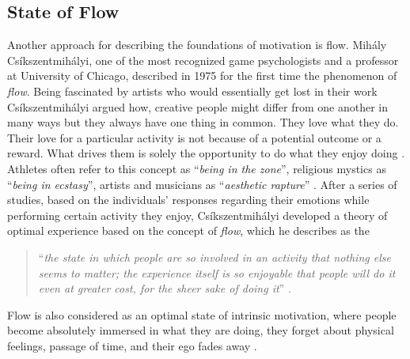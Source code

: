 \subsection{State of Flow}
Another approach for describing the foundations of motivation is \acrlong{flow}. Mih\'{a}ly Cs\'{i}kszentmih\'{a}lyi, one of the most recognized game psychologists and a professor at University of Chicago, described in 1975 for the first time the phenomenon of \textit{flow}. Being fascinated by artists who would essentially get lost in their work Cs\'{i}kszentmih\'{a}lyi argued how, creative people might differ from one another in many ways but they always have one thing in common. They love what they do. Their love for a particular activity is not because of a potential outcome or a reward. What drives them is solely the opportunity to do what they enjoy doing \cite{csikszentmihalyi1996flow}. Athletes often refer to this concept as ``\textit{being in the zone}'', religious mystics
as ``\textit{being in ecstasy}'', artists and musicians as ``\textit{aesthetic rapture}'' \cite{csikszentmihalyi1997finding}. After a series of studies, based on the individuals' responses regarding their emotions while performing certain activity they enjoy, Cs\'{i}kszentmih\'{a}lyi  developed a theory of optimal experience based on the concept of \textit{flow}, which he describes as the
\begin{quotation}
``\textit{the state in which people are so involved in an activity that nothing else seems to matter; the experience itself is so enjoyable that people will do it even at greater cost, for the sheer sake of doing it}'' \cite{flow1990psychology}.
\end{quotation} 
Flow is also considered as an optimal state of intrinsic motivation, where people become absolutely immersed in what they are doing, they forget about physical feelings, passage of time, and their ego fades away \cite{lithiumGamification}. 

